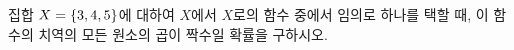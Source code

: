 집합 $X=\{3{,}\mkern3mu\mathopen{}4{,}\mkern3mu\mathopen{}5\}$에 대하여 $X$에서 $X$로의 함수 중에서 임의로 하나를 택할 때, 이 함수의 치역의 모든 원소의 곱이 짝수일 확률을 구하시오.

